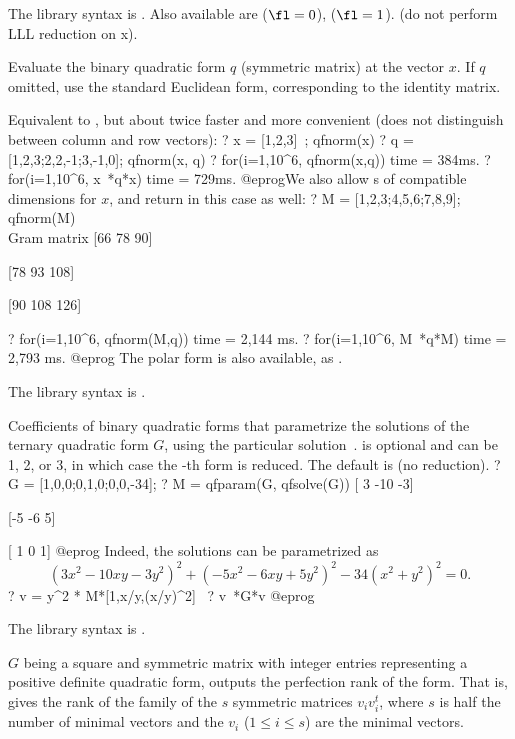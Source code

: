 The library syntax is .
Also available are
 ($\fl=0$),
 ($\fl=1$).
 (do not perform LLL
reduction on x).

\label{se:qfnorm}
Evaluate the binary quadratic form $q$ (symmetric matrix)
at the vector $x$. If $q$ omitted, use the standard Euclidean form,
corresponding to the identity matrix.

Equivalent to , but about twice faster and
more convenient (does not distinguish between column and row vectors):
\bprog
? x = [1,2,3]~; qfnorm(x)
? q = [1,2,3;2,2,-1;3,-1,0]; qfnorm(x, q)
? for(i=1,10^6, qfnorm(x,q))
time = 384ms.
? for(i=1,10^6, x~*q*x)
time = 729ms.
@eprog\noindent We also allow s of compatible dimensions for $x$,
and return  in this case as well:
\bprog
? M = [1,2,3;4,5,6;7,8,9]; qfnorm(M) \\ Gram matrix
[66  78  90]

[78  93 108]

[90 108 126]

? for(i=1,10^6, qfnorm(M,q))
time = 2,144 ms.
? for(i=1,10^6, M~*q*M)
time = 2,793 ms.
@eprog
\noindent The polar form is also available, as .

The library syntax is .

\label{se:qfparam}
Coefficients of binary quadratic forms that parametrize the
solutions of the ternary quadratic form $G$, using the particular
solution~.
\fl is optional and can be 1, 2, or 3, in which case the \fl-th form is
reduced. The default is  (no reduction).
\bprog
? G = [1,0,0;0,1,0;0,0,-34];
? M = qfparam(G, qfsolve(G))
[ 3 -10 -3]

[-5  -6  5]

[ 1   0  1]
@eprog
Indeed, the solutions can be parametrized as
$$(3x^2 - 10xy - 3y^2)^2  + (-5x^2 - 6xy + 5y^2)^2 -34(x^2 + y^2)^2 = 0.$$
\bprog
? v = y^2 * M*[1,x/y,(x/y)^2]~
? v~*G*v
@eprog

The library syntax is .

\label{se:qfperfection}
$G$ being a square and symmetric matrix with
integer entries representing a positive definite quadratic form, outputs the
perfection rank of the form. That is, gives the rank of the family of the $s$
symmetric matrices $v_iv_i^t$, where $s$ is half the number of minimal
vectors and the $v_i$ ($1\le i\le s$) are the minimal vectors.

